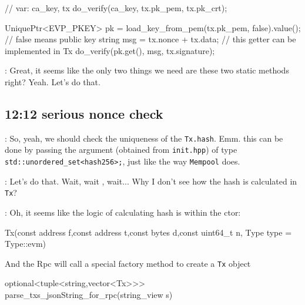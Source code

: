 \documentclass[dvipsnames]{article}
\begin{document}
\begin{simplec}
// var: ca_key, tx
do_verify(ca_key, tx.pk_pem, tx.pk_crt);

UniquePtr<EVP_PKEY> pk = load_key_from_pem(tx.pk_pem, false).value(); // false means public key
string msg = tx.nonce + tx.data; // this getter can be implemented in Tx
do_verify(pk.get(), msg, tx.signature);
\end{simplec}

 : Great, it seems like the only two things we need are these two
static methods right? Yeah. Let's do that.

\subsection*{12:12 serious nonce check}


 : So, yeah, we should check the uniqueness of the
\texttt{Tx.hash}. Emm. this can be done by passing the argument (obtained from
\texttt{init.hpp}) of type \texttt{std::unordered\_set<hash256>;}, just like the
way \texttt{Mempool} does.

 : Let's do that. Wait, wait , wait... Why I don't see how the
hash is calculated in \texttt{Tx}?

 : Oh, it seems like the logic of calculating hash is within the ctor:

\begin{simplec}
Tx(const address f,const address t,const bytes d,const uint64_t n, Type type = Type::evm)
\end{simplec}

And the Rpc will call a special factory method to create a \texttt{Tx} object

\begin{simplec}
optional<tuple<string,vector<Tx>>> parse_txs_jsonString_for_rpc(string_view s)
\end{simplec}
\end{document}
